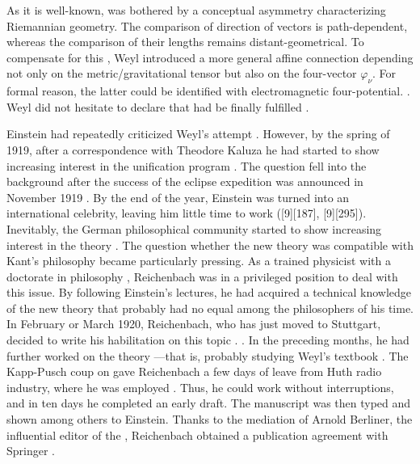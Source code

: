 \documentclass[draft]{article}
\newcommand{\phin}{\ensuremath{\varphi_\nu}\xspace}
\begin{document}
As it is well-known, \citet{Weyl1918a,Weyl1919a} was bothered by a conceptual asymmetry characterizing Riemannian geometry. The comparison of direction of vectors is path-dependent, whereas the comparison of their lengths remains distant-geometrical. To compensate for this   \citep{Afriat2009}, Weyl introduced a more general affine connection depending not only on the metric/gravitational tensor \gmn but also on the four-vector \phin. For formal reason, the latter could be identified with electromagnetic four-potential. . Weyl did not hesitate to declare that  had be finally fulfilled \citep[263]{Weyl1919}.

Einstein had repeatedly criticized Weyl's attempt \citep{Einstein1918b}. However, by the spring of 1919, after a correspondence with Theodore Kaluza he had started to show increasing interest in the unification program \citep{Wuensch2005}. The question fell into the background after the success of the eclipse expedition was announced in November 1919 \citep{Dyson1920}. By the end of the year, Einstein was turned into an international celebrity, leaving him little time to work ([9][187], [9][295]). Inevitably, the German philosophical community started to show increasing interest in the theory \citep[see][for an overview]{Hentschel1990a}. The question whether the new theory was compatible with Kant's philosophy became particularly pressing. As a trained physicist with a doctorate in philosophy \cite{Reichenbach1916}, Reichenbach was in a privileged position to deal with this issue. By following Einstein's lectures, he had acquired a technical knowledge of the new theory that probably had no equal among the philosophers of his time. In February or March 1920, Reichenbach, who has just moved to Stuttgart, decided to write his habilitation on this topic . . In the preceding months, he had further worked on the theory  \citep[044-06-23]{HR}---that is, probably studying Weyl's textbook  \citep{Weyl1918}. The Kapp-Pusch coup on  gave Reichenbach a few days of leave from Huth radio industry, where he was employed \citep[044-06-23]{HR}. Thus, he could work without interruptions, and in ten days he completed an early draft. The manuscript was then typed and shown among others to Einstein. Thanks to the mediation of Arnold Berliner, the influential editor of the , Reichenbach obtained a publication agreement with Springer \citep[044-06-23]{HR}.
\end{document}
